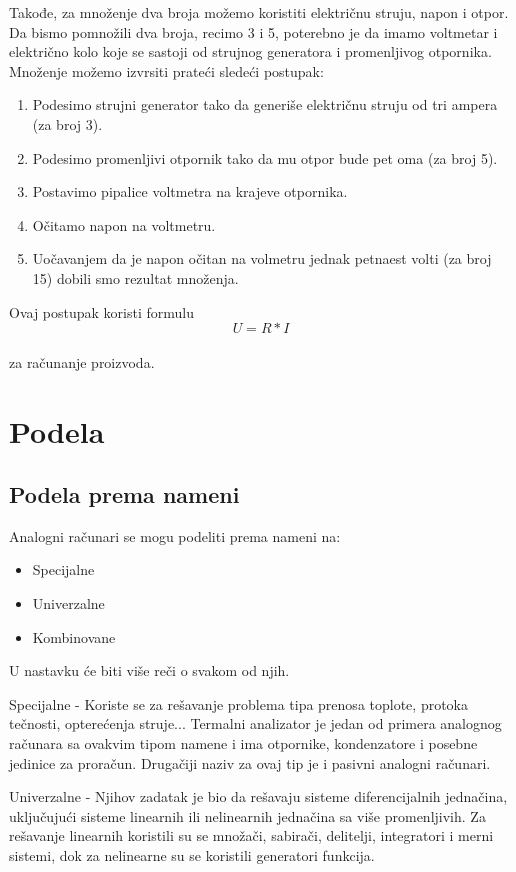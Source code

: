 \documentclass[a4paper]{article}
\begin{document}
    Takođe, za množenje dva broja možemo koristiti električnu struju, napon i otpor.\\
    Da bismo pomnožili dva broja, recimo 3 i 5, poterebno je da imamo voltmetar i električno kolo koje se sastoji od strujnog generatora i promenljivog otpornika. Množenje možemo izvrsiti prateći sledeći postupak:\begin{enumerate}
        \item Podesimo strujni generator tako da generiše električnu struju od tri ampera (za broj 3).
        \item Podesimo promenljivi otpornik tako da mu otpor bude pet oma (za broj 5).
        \item Postavimo pipalice voltmetra na krajeve otpornika.
        \item Očitamo napon na voltmetru.
        \item Uočavanjem da je napon očitan na volmetru jednak petnaest volti (za broj 15) dobili smo rezultat množenja.
    \end{enumerate}
    \centering Ovaj postupak koristi formulu
    \centering $$ U = R*I $$\\
    \centering za računanje proizvoda.


\section{Podela}
\label{sec:naslovcic}
\subsection{Podela prema nameni}
Analogni računari se mogu podeliti prema nameni na:
	\begin{itemize}
		\item Specijalne
		\item Univerzalne
		\item Kombinovane
	\end{itemize}
U nastavku će biti više reči o svakom od njih.

Specijalne - Koriste se za rešavanje problema tipa prenosa toplote, protoka tečnosti, opterećenja struje... Termalni analizator je jedan od primera analognog računara sa ovakvim tipom namene i ima otpornike, kondenzatore i posebne jedinice za proračun. Drugačiji naziv za ovaj tip je i pasivni analogni računari.


Univerzalne - Njihov zadatak je bio da rešavaju sisteme diferencijalnih jednačina, uključujući sisteme linearnih ili nelinearnih jednačina sa više promenljivih. Za rešavanje linearnih koristili su se množači, sabirači, delitelji, integratori i merni sistemi, dok za nelinearne su se koristili generatori funkcija.
\end{document}
